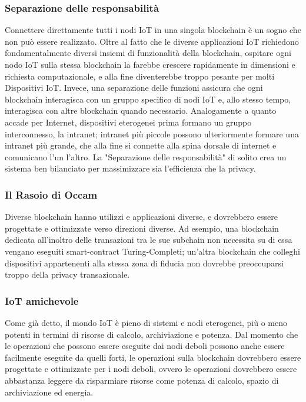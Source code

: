 \documentclass[a4paper,12pt]{article}
\begin{document}
\subsubsection{Separazione delle responsabilità}
Connettere direttamente tutti i nodi IoT in una singola blockchain è un sogno che non può essere realizzato. Oltre al fatto che le diverse applicazioni IoT richiedono fondamentalmente diversi insiemi di funzionalità della blockchain, ospitare ogni nodo IoT sulla stessa blockchain la farebbe crescere rapidamente in dimensioni e richiesta computazionale, e alla fine diventerebbe troppo pesante per molti Dispositivi IoT. Invece, una separazione delle funzioni assicura che ogni blockchain interagisca con un gruppo specifico di nodi IoT e, allo stesso tempo, interagisca con altre blockchain quando necessario. Analogamente a quanto accade per Internet, dispositivi eterogenei prima formano un gruppo interconnesso, la intranet; intranet più piccole possono ulteriormente formare una intranet più grande, che alla fine si connette alla spina dorsale di internet e comunicano l'un l'altro.
La "Separazione delle responsabilità" di solito crea un sistema ben bilanciato per massimizzare sia l'efficienza che la privacy.

\subsubsection{Il Rasoio di Occam}
Diverse blockchain hanno utilizzi e applicazioni diverse, e dovrebbero essere progettate e ottimizzate verso direzioni diverse. Ad esempio, una blockchain dedicata all'inoltro delle transazioni tra le sue subchain non necessita su di essa vengano eseguiti smart-contract Turing-Completi; un'altra blockchain che colleghi dispositivi appartenenti alla stessa zona di fiducia non dovrebbe preoccuparsi troppo della privacy transazionale.

\subsubsection{IoT amichevole}
Come già detto, il mondo IoT è pieno di sistemi e nodi eterogenei, più o meno potenti in termini di risorse di calcolo, archiviazione e potenza. Dal momento che le operazioni che possono essere eseguite dai nodi deboli possono anche essere facilmente eseguite da quelli forti, le operazioni sulla blockchain dovrebbero essere progettate e ottimizzate per i nodi deboli, ovvero le operazioni dovrebbero essere abbastanza leggere da risparmiare risorse come potenza di calcolo, spazio di archiviazione ed energia.
\end{document}
